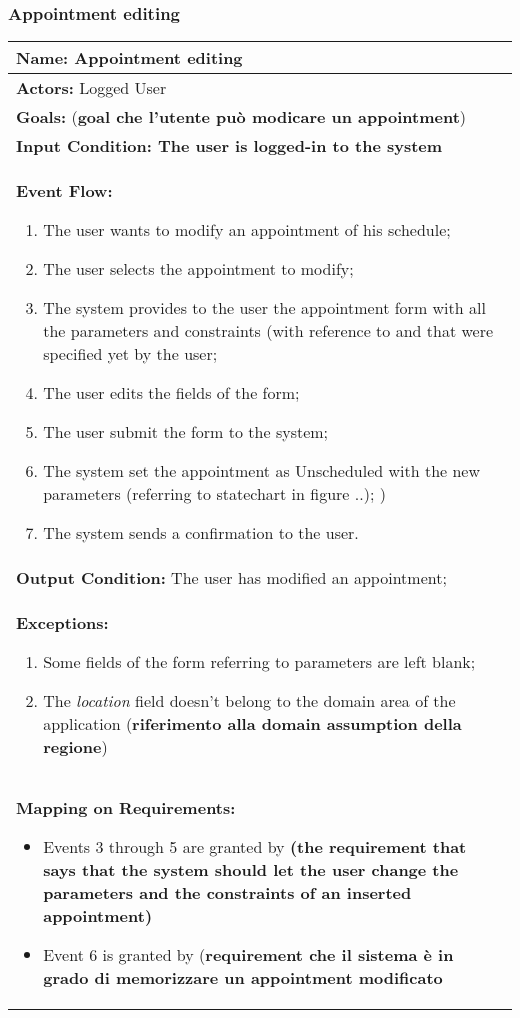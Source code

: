 \subsubsection{Appointment editing}\label{usecase:appediting}
\begin{longtable}{|p{14cm}|} \hline
\textbf{Name:} Appointment editing \\ \hline
\textbf{Actors:} Logged User \\ \hline
\textbf{Goals:} (\textbf{goal che l'utente può modicare un appointment})\\ \hline
\textbf{Input Condition: The user is logged-in to the system} \\ \hline
\textbf{Event Flow:}
\begin{enumerate}
\item The user wants to modify an appointment of his schedule;
\item The user selects the appointment to modify;
\item The system provides to the user the appointment form with all the parameters and constraints (with reference to %
and 
that were specified yet by the user; 
\item The user edits the fields of the form;
\item The user submit the form to the system;
\item The system set the appointment as Unscheduled with the new parameters (referring to statechart in figure ..); \label{fig:stchartApp})
\item The system sends a confirmation to the user.
\end{enumerate}	\\ \hline
\textbf{Output Condition:}  The user has modified an appointment; \\ \hline
\textbf{Exceptions:}
\begin{enumerate}
\item Some fields of the form referring to parameters are left blank;
\item The \textit{location} field doesn't belong to the domain area of the application (\textbf{riferimento alla domain assumption della regione})
\end{enumerate} \\ \hline
\textbf{Mapping on Requirements:}
\begin{itemize}
\item Events 3 through 5 are granted by \textbf{(the requirement that says that the system should let the user change the parameters and the constraints of an inserted appointment)}
\item Event 6 is granted by (\textbf{requirement che il sistema è in grado di memorizzare un appointment modificato}
\end{itemize}  \\ \hline

\end{longtable}

